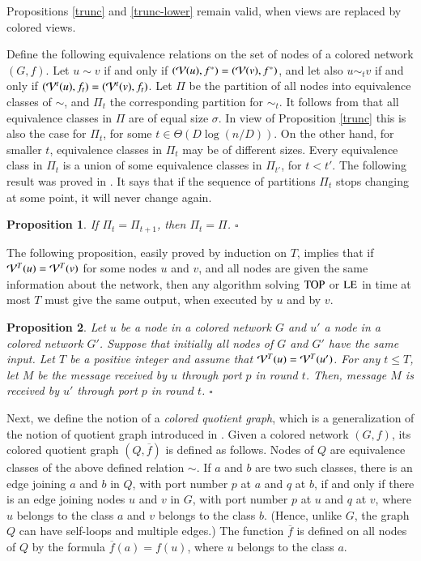 \documentclass[a4paper,10pt]{article}
\newtheorem{proposition}{Proposition}[section]
\newcommand{\view}[1][]{\if!#1!\mathcal{V}\else\mathcal{V}^{#1}\fi}
\newcommand{\problemLE}{\textup{LE}}
\newcommand{\problemTOP}{\textup{TOP}}
\newcommand{\cV}{{\cal V}}
\newcommand{\qed}{\hfill $\square$ \smallbreak}
\begin{document}
Propositions \ref{trunc} and \ref{trunc-lower} remain valid, when views are replaced by colored views.

Define the following equivalence relations on the set of nodes of a colored network $(G,f)$.
{Let} $u\sim v$ if and only if $(\cV(u),f^*)=(\cV(v), f^*)$, and {let also} $u\sim_t v$ if and only if $(\cV^t(u), f_t)=(\cV^t(v), f_t)$.
Let $\Pi$ be the partition of all nodes into equivalence classes of $\sim$, and $\Pi_t$ the corresponding partition for  $\sim_t$.
It follows from \cite{YK3} that all equivalence classes in $\Pi$ are of equal size $\sigma$. In view of Proposition \ref{trunc}
this is also the case for $\Pi_t$, for some $t\in \Theta(D \log (n/D))$. On the other hand, for smaller $t$, equivalence classes in $\Pi_t$ 
may be of different sizes.  
Every equivalence class in  $\Pi_t$ is a union of some equivalence classes in  $\Pi_{t'}$, for $t<t'$.  
The following result was proved in \cite{Norris}. It says that if the sequence of partitions $\Pi_t$ stops changing at some point, it will never change again. 

\begin{proposition}\label{stop}
If $\Pi_t=\Pi_{t+1}$, then $\Pi_t=\Pi$.
\qed\end{proposition}

The following proposition, easily proved by induction on $T$, implies that if $\view[T](u)=\view[T](v)$ for some nodes $u$ and $v$, and all nodes are given the same information about the network, then any algorithm solving $\problemTOP$ or $\problemLE$ in time at most $T$ must give the same output, when executed by $u$ and by $v$.
\begin{proposition} \label{prop:algoView}
Let $u$ be a node in a colored network $G$ and $u'$ a node in a colored network $G'$.
Suppose that initially all nodes of $G$ and $G'$ have the same input.
Let $T$ be a positive integer and assume that $\view[T](u)=\view[T](u')$.
For any $t\leq T$, let $M$ be the message received by $u$ through port $p$ in round $t$.
Then, message $M$ is received by $u'$ through port $p$ in round $t$.
\qed
\end{proposition}

Next, we define the notion of a {\em colored quotient graph}, which is a generalization of the
notion of quotient graph introduced in  \cite{YK3}. Given a colored network $(G,f)$, its colored quotient
graph $(Q,\overline{f})$ is defined as follows.  Nodes of $Q$ are equivalence classes of the above defined relation $\sim$. If $a$ and $b$ are two such classes, there is an edge joining $a$ and $b$
in $Q$, with port number $p$ at $a$ and $q$ at $b$, if and only if there is an edge joining nodes $u$ and
$v$ in $G$, with port number $p$ at $u$ and $q$ at $v$, where $u$ belongs to the class $a$ and $v$ belongs to the class $b$. (Hence, unlike $G$, the graph $Q$ can have self-loops and multiple
edges.) The function $\overline{f}$ is defined on all nodes of $Q$ by the formula
$\overline{f}(a)=f(u)$, where $u$ belongs to the class $a$. 
\end{document}
